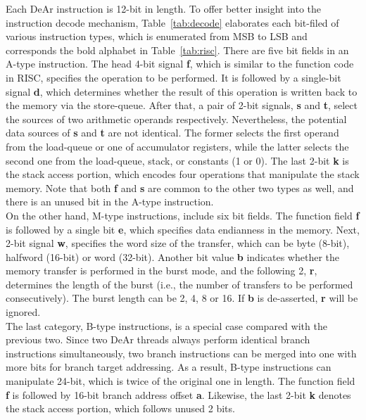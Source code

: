 Each DeAr instruction is 12-bit in length.
To offer better insight into the instruction decode mechanism, 
Table~\ref{tab:decode} elaborates each bit-filed of various instruction types, 
which is enumerated from MSB to LSB and corresponds the bold alphabet in Table~\ref{tab:risc}.
There are five bit fields in an A-type instruction.
The head 4-bit signal \textbf{f}, which is similar to the function code in RISC, specifies the operation to be performed.
It is followed by a single-bit signal \textbf{d}, which determines whether the result of this operation is written back to the memory via the store-queue.
After that, a pair of 2-bit signals, \textbf{s} and \textbf{t}, select the sources of two arithmetic operands respectively. 
Nevertheless, the potential data sources of \textbf{s} and \textbf{t} are not identical.
The former selects the first operand from the load-queue or one of accumulator registers, 
while the latter selects the second one from the load-queue, stack, or constants (1 or 0).
The last 2-bit \textbf{k} is the stack access portion, which encodes four operations that manipulate the stack memory.
Note that both \textbf{f} and \textbf{s} are common to the other two types as well, 
and there is an unused bit in the A-type instruction.
\\\indent On the other hand, M-type instructions, include six bit fields.
The function field \textbf{f} is followed by a single bit \textbf{e}, which specifies data endianness in the memory.
Next, 2-bit signal \textbf{w}, specifies the word size of the transfer, which can be byte (8-bit), halfword (16-bit) or word (32-bit).
Another bit value \textbf{b} indicates whether the memory transfer is performed in the burst mode, 
and the following 2, \textbf{r}, determines the length of the burst (i.e., the number of transfers to be performed consecutively).
The burst length can be 2, 4, 8 or 16.
If \textbf{b} is de-asserted, \textbf{r} will be ignored.
\\\indent The last category, B-type instructions, is a special case compared with the previous two.
Since two DeAr threads always perform identical branch instructions simultaneously, 
two branch instructions can be merged into one with more bits for branch target addressing.
As a result, B-type instructions can manipulate 24-bit, which is twice of the original one in length.
The function field \textbf{f} is followed by 16-bit branch address offset \textbf{a}.
Likewise, the last 2-bit \textbf{k} denotes the stack access portion, which follows unused 2 bits.

